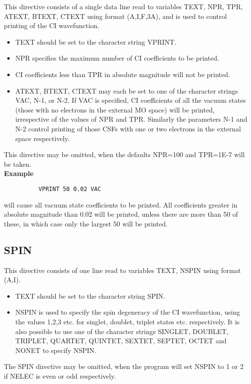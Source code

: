 \documentclass[11pt,fleqn]{article}
\begin{document}
 This directive consists of a single data line read to variables
TEXT, NPR, TPR, ATEXT, BTEXT, CTEXT using format (A,I,F,3A), and is used
to control printing of the CI wavefunction.
\begin{itemize}
\item TEXT should be set to the character string VPRINT.
\item  NPR specifies the maximum number of CI coefficients to be printed.
\item  CI coefficients less than TPR in absolute magnitude will not be
printed.
\item  ATEXT, BTEXT, CTEXT may each be set to one of the character strings
VAC, N-1, or N-2. If VAC is specified, CI coefficients of all the
vacuum states (those with no electrons in the external MO space) will
be printed, irrespective of the values of NPR and TPR. Similarly
the parameters N-1 and N-2 control printing of those CSFs with one or
two electrons in the external space respectively.
\end{itemize}
 This directive may be omitted, when the defaults NPR=100 and
TPR=1E-7 will be taken.\\

{\bf Example }
{
\footnotesize
\begin{verbatim}
          VPRINT 50 0.02 VAC
\end{verbatim}
}

will cause all vacuum state coefficients to be printed.
All coefficients greater in absolute magnitude than 0.02 will be printed,
unless there are more than 50 of these, in which case only the largest
50 will be printed.

\subsection[SPIN]{SPIN}

This directive consists of one line read to variables TEXT, NSPIN
using format (A,I).
\begin{itemize}
\item  TEXT should be set to the character string SPIN.
\item  NSPIN is used to specify the spin degeneracy 
of the CI wavefunction,
using the values 1,2,3 etc. for singlet, doublet, triplet states etc.
respectively. It is also possible to use one of the character strings
SINGLET, DOUBLET, TRIPLET, QUARTET, QUINTET, SEXTET, SEPTET, OCTET and
NONET to specify NSPIN.
\end{itemize}
The SPIN directive may be omitted, when the program will set NSPIN
to 1 or 2 if NELEC is even or odd respectively.\\
\end{document}
